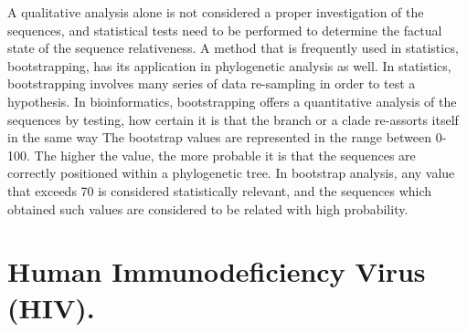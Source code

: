 A qualitative analysis alone is not considered a proper investigation of the sequences, and statistical tests need to be performed to determine the factual state of the sequence relativeness. 
A method that is frequently used in statistics, bootstrapping, has its application in phylogenetic analysis as well. 
In statistics, bootstrapping involves many series of data re-sampling in order to test a hypothesis.
In bioinformatics, bootstrapping offers a quantitative analysis of the sequences by testing, how certain it is that the branch or a clade re-assorts itself in the same way \cite{ojha_2022_computational}
The bootstrap values are represented in the range between 0-100. The higher the value, the more probable it is that the sequences are correctly positioned within a phylogenetic tree. 
In bootstrap analysis, any value that exceeds 70 is considered statistically relevant, and the sequences which obtained such values are considered to be related with high probability. 

\section{Human Immunodeficiency Virus (HIV).}

